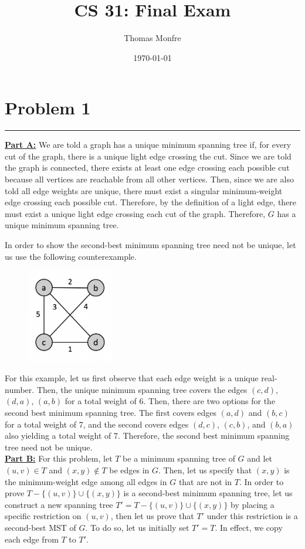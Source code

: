 \documentclass[11pt]{article}
\title{CS 31: Final Exam}
\author{Thomas Monfre}
\date{\today}
\def\separateline{\medskip\hrule\medskip}
\begin{document}
\setlength{\abovedisplayskip}{0pt}

\maketitle

\section{Problem 1}
\separateline

\underline{\textbf{Part A:}} We are told a graph has a unique minimum spanning tree if, for every cut of the graph, there is a unique light edge crossing the cut. Since we are told the graph is connected, there exists at least one edge crossing each possible cut because all vertices are reachable from all other vertices. Then, since we are also told all edge weights are unique, there must exist a singular minimum-weight edge crossing each possible cut. Therefore, by the definition of a light edge, there must exist a unique light edge crossing each cut of the graph. Therefore, $G$ has a unique minimum spanning tree.

In order to show the second-best minimum spanning tree need not be unique, let us use the following counterexample.

\begin{figure}[ht]
    \includegraphics[width=1.5in]{prob1graph.png}
\end{figure}

For this example, let us first observe that each edge weight is a unique real-number. Then, the unique minimum spanning tree covers the edges $(c,d)$, $(d,a)$, $(a,b)$ for a total weight of 6. Then, there are two options for the second best minimum spanning tree. The first covers edges $(a,d)$ and $(b,c)$ for a total weight of 7, and the second covers edges $(d,c)$, $(c,b)$, and $(b,a)$ also yielding a total weight of 7. Therefore, the second best minimum spanning tree need not be unique.\\

\underline{\textbf{Part B:}} For this problem, let $T$ be a minimum spanning tree of $G$ and let $(u,v) \in T$ and $(x,y) \notin T$ be edges in $G$. Then, let us specify that $(x,y)$ is the minimum-weight edge among all edges in $G$ that are not in $T$. In order to prove $T - \{(u,v)\} \cup \{(x,y)\}$ is a second-best minimum spanning tree, let us construct a new spanning tree $T' = T - \{(u,v)\} \cup \{(x,y)\}$ by placing a specific restriction on $(u,v)$, then let us prove that $T'$ under this restriction is a second-best MST of $G$. To do so, let us initially set $T' = T$. In effect, we copy each edge from $T$ to $T'$.
\end{document}
